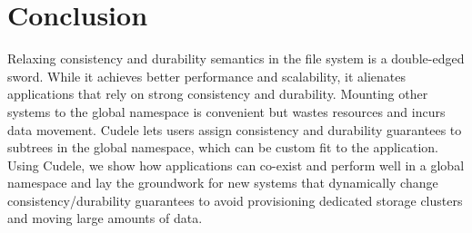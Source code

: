 %
%
%
%
%
%
%

\section{Conclusion}

Relaxing consistency and durability semantics in the file system is a
double-edged sword. While it achieves better performance and scalability, it
alienates applications that rely on strong consistency and durability. Mounting
other systems to the global namespace is convenient but wastes resources and
incurs data movement.  Cudele lets users assign consistency and durability
guarantees to subtrees in the global namespace, which can be custom fit to the
application. Using Cudele, we show how applications can co-exist and perform
well in a global namespace and lay the groundwork for new systems that
dynamically change consistency/durability guarantees to avoid provisioning
dedicated storage clusters and moving large amounts of data.




